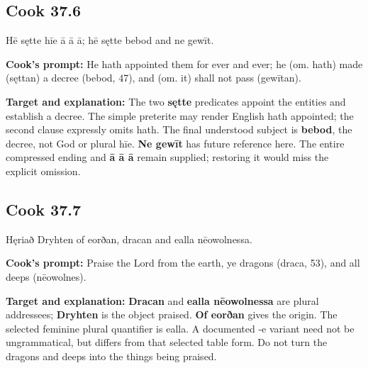 \par\begin{minipage}{\linewidth}\raggedright
\subsection*{Cook 37.6}

Hē sętte hīe ā ā ā; hē sętte bebod and ne gewīt.

\textbf{Cook's prompt:} He hath appointed them for ever and ever; he (om. hath) made (sęttan) a decree (bebod, 47), and (om. it) shall not pass (gewītan).

\textbf{Target and explanation:} The two \textbf{sętte} predicates appoint the entities and establish a decree. The simple preterite may render English hath appointed; the second clause expressly omits hath. The final understood subject is \textbf{bebod}, the decree, not God or plural hīe. \textbf{Ne gewīt} has future reference here. The entire compressed ending and \textbf{ā ā ā} remain supplied; restoring it would miss the explicit omission.

\end{minipage}\par\addvspace{4pt}

\par\begin{minipage}{\linewidth}\raggedright
\subsection*{Cook 37.7}

Hęriað Dryhten of eorðan, dracan and ealla nēowolnessa.

\textbf{Cook's prompt:} Praise the Lord from the earth, ye dragons (draca, 53), and all deeps (nēowolnes).

\textbf{Target and explanation:} \textbf{Dracan} and \textbf{ealla nēowolnessa} are plural addressees; \textbf{Dryhten} is the object praised. \textbf{Of eorðan} gives the origin. The selected feminine plural quantifier is ealla. A documented -e variant need not be ungrammatical, but differs from that selected table form. Do not turn the dragons and deeps into the things being praised.

\end{minipage}\par\addvspace{4pt}

